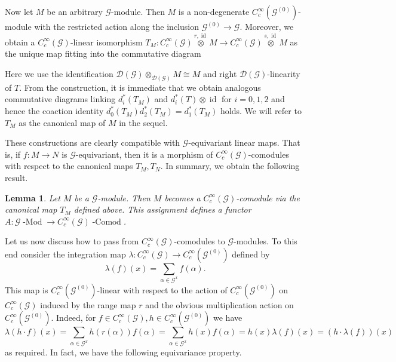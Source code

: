\documentclass{amsart}
\newtheorem{lemma}[thm]{Lemma}
\newcommand{\G}{\mathcal{G}}
\newcommand{\DG}{\mathcal{D}(\mathcal{G})}
\newcommand{\ccinfty}{C_c^\infty}
\DeclareMathOperator{\id}{id}
\begin{document}
Now let $ M $ be an arbitrary $ \G $-module. Then $ M $ is a non-degenerate $ \ccinfty(\G^{(0)}) $-module with the restricted action along the inclusion $ \G^{(0)} \rightarrow \G $. Moreover, we obtain a $ \ccinfty(\G) $-linear isomorphism $ T_M:\ccinfty(\G)\stackrel{r,\id}{\otimes} M \rightarrow \ccinfty(\G)\stackrel{s,\id}{\otimes} M $  
as the unique map fitting into the commutative diagram 
\begin{center}
\end{center}
Here we use the identification $ \DG \otimes_{\DG} M \cong M $ and right $ \DG $-linearity of $ T $. 
From the construction, it is immediate that we obtain analogous commutative diagrams linking $ d_i^*(T_M) $ and $ d_i^*(T) \otimes \id $ for $ i = 0,1,2 $ and hence the coaction identity 
$ d_0^*(T_M) d_2^*(T_M) = d_1^*(T_M) $ holds. We will refer to $ T_M $ as the canonical map of $ M $ in the sequel. 

These constructions are clearly compatible with $ \G $-equivariant linear maps. That is, if $ f: M \rightarrow N $ is $ \G $-equivariant, then it is a morphism of $ \ccinfty(\G) $-comodules with respect to the canonical maps $ T_M, T_N $. 
In summary, we obtain the following result. 

\begin{lemma} \label{modtocomod}
Let $ M $ be a $ \G $-module. Then $ M $ becomes a $ \ccinfty(\G) $-comodule via the canonical map $ T_M $ defined above. This assignment defines a functor $ A: \G \operatorname{-Mod} \rightarrow \ccinfty(\G) \operatorname{-Comod} $. 
\end{lemma}

Let us now discuss how to pass from $ \ccinfty(\G) $-comodules to $ \G $-modules. To this end consider the integration map $ \lambda: \ccinfty(\G) \rightarrow\ccinfty(\G^{(0)}) $ defined by 
$$ 
\lambda(f)(x) = \sum_{\alpha\in \G^x} f(\alpha).
$$
This map is $ \ccinfty(\G^{(0)}) $-linear with respect to the action of $ \ccinfty(\G^{(0)}) $ on $ \ccinfty(\G) $ induced by the range map $ r $ and the obvious multiplication action on $ \ccinfty(\G^{(0)}) $. Indeed, for $ f \in \ccinfty(\G), h \in \ccinfty(\G^{(0)}) $ we have
$$
\lambda(h \cdot f)(x) = \sum_{\alpha\in \G^x} h(r(\alpha))f(\alpha)  = \sum_{\alpha\in \G^x} h(x) f(\alpha) = h(x) \lambda(f)(x) = (h \cdot \lambda(f))(x) 
$$ 
as required. In fact, we have the following equivariance property. 
\end{document}
